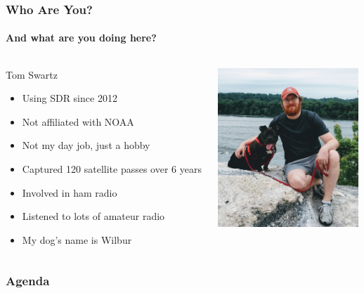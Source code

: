 \documentclass[]{beamer}
\begin{document}
\begin{frame}
    \frametitle{Who Are You?}
    \framesubtitle{And what are you doing here?}
    \begin{columns}[T]
        \begin{column}[T]{5cm}
           {\huge Tom Swartz}
            \begin{itemize}%
                \item<1->{Using SDR since 2012}
                \item<1->{Not affiliated with NOAA}
                \item<1->{Not my day job, just a hobby}
                \item<1->{Captured 120 satellite passes over 6 years}
                \item<1->{Involved in ham radio}
                \item<1->{Listened to lots of amateur radio}
                \item<2->{My dog's name is Wilbur}
            \end{itemize}
        \end{column}
        \begin{column}[T]{5cm}
            \includegraphics[height=6cm]{images/me.jpg}
        \end{column}
    \end{columns}
\end{frame}

\begin{frame}
    \frametitle{Agenda}
    \tableofcontents
\end{frame}


\end{document}
